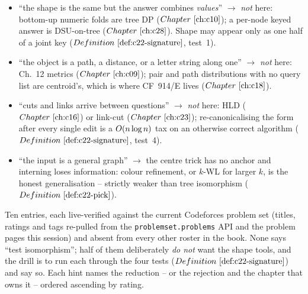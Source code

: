 \begin{itemize}[nosep, leftmargin=1.4em]
        equal piece sizes as a filter, then \(\Phi\) per piece as the proof
        (\(\probref{c22-summit}\), \(\coderef{c22-summit}\)).
  \item ``the shape is the same but the answer combines \emph{values}'' \(\to\)
        \emph{not} here: bottom-up numeric folds are tree DP (\(\chref{c10}\)); a per-node
        keyed answer is DSU-on-tree (\(\chref{c28}\)). Shape may appear only as one half of
        a joint key (\(\defref{c22-signature}\), test~1).
  \item ``the object is a path, a distance, or a letter string along one'' \(\to\)
        \emph{not} here: Ch.~12 metrics (\(\chref{c09}\)); pair and path distributions with
        no query list are centroid's, which is where CF~914/E lives (\(\chref{c18}\)).
  \item ``cuts and links arrive between questions'' \(\to\) \emph{not} here: HLD
        (\(\chref{c16}\)) or link-cut (\(\chref{c23}\)); re-canonicalising the form after
        every single edit is a \(O(n\log n)\) tax on an otherwise correct algorithm
        (\(\defref{c22-signature}\), test~4).
  \item ``the input is a general graph'' \(\to\) the centre trick has no anchor and
        interning loses information: colour refinement, or \(k\)-WL for larger \(k\), is the
        honest generalisation -- strictly weaker than tree isomorphism
        (\(\defref{c22-pick}\)).
\end{itemize}


Ten entries, each live-verified against the current Codeforces problem set (titles,
ratings and tags re-pulled from the \texttt{problemset.problems} API and the problem pages
this session) and absent from every other roster in the book. None says ``test
isomorphism''; half of them deliberately \emph{do not} want the shape tools, and the drill
is to run each through the four tests (\(\defref{c22-signature}\)) and say so. Each hint
names the reduction -- or the rejection and the chapter that owns it -- ordered ascending
by rating.

